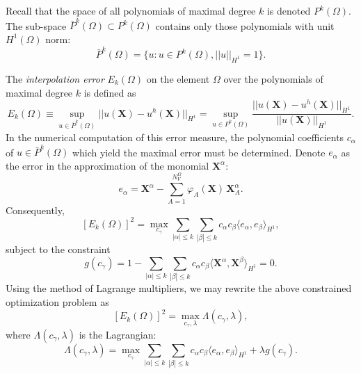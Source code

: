 Recall that the space of all polynomials of maximal degree $k$ is denoted $P^k (\Omega)$. The sub-space $\bar{P}^k (\Omega) \subset P^k (\Omega)$ contains only those polynomials with unit $H^1 (\Omega)$ norm:
\begin{equation}
        \bar{P}^k (\Omega) = \{ u : u \in P^k (\Omega), ||u||_{H^1} = 1 \}.
\end{equation}

The \textit{interpolation error} $E_k (\Omega)$ on the element $\Omega$ over the polynomials of maximal degree $k$ is defined as
\begin{equation}
        E_k (\Omega) \equiv \sup_{u \in \bar{P}^k (\Omega)} || u(\mathbf{X}) - u^h(\mathbf{X}) ||_{H^1} = \sup_{u \in P^k (\Omega)} \frac{|| u(\mathbf{X}) - u^h(\mathbf{X}) ||_{H^1}}{|| u(\mathbf{X}) ||_{H^1}}.
\end{equation}
In the numerical computation of this error measure, the polynomial coefficients $c_\alpha$ of $u \in \bar{P}^k (\Omega)$ which yield the maximal error must be determined. Denote $e_\alpha$ as the error in the approximation of the monomial $\mathbf{X}^\alpha$:
\begin{equation}
        e_\alpha = \mathbf{X}^{\alpha} - \sum_{A = 1}^{N^{\Omega}_V} \varphi_A (\mathbf{X}) \, \mathbf{X}_A^{\alpha}.
\end{equation}
Consequently,
\begin{equation}
        \left[ E_k (\Omega) \right]^2 = \max_{c_\gamma} \sum_{|\alpha| \leq k} \sum_{|\beta| \leq k} c_{\alpha} c_{\beta} \langle e_\alpha, e_\beta \rangle_{H^1},
\end{equation}
subject to the constraint
\begin{equation}
        g(c_\gamma) = 1 - \sum_{|\alpha| \leq k} \sum_{|\beta| \leq k} c_{\alpha} c_{\beta} \langle \mathbf{X}^\alpha, \mathbf{X}^\beta \rangle_{H^1} = 0.
\end{equation}
Using the method of Lagrange multipliers, we may rewrite the above constrained optimization problem as
\begin{equation}
        \left[ E_k (\Omega) \right]^2 = \max_{c_\gamma, \lambda} \Lambda (c_\gamma,\lambda),
\end{equation}
where $\Lambda (c_\gamma,\lambda)$ is the Lagrangian:
\begin{equation}
        \Lambda (c_\gamma, \lambda) = \max_{c_\gamma} \sum_{|\alpha| \leq  k} \sum_{|\beta| \leq k} c_{\alpha} c_{\beta} \langle e_\alpha, e_\beta \rangle_{H^1} + \lambda g(c_\gamma).
\end{equation}
